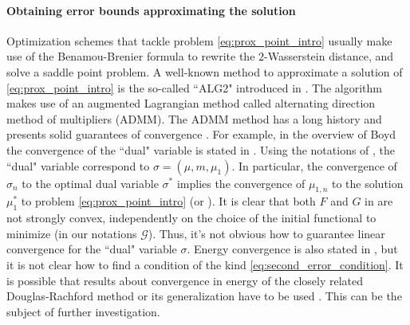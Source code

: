 \documentclass[11pt]{article}
\newcommand{\cG}{\mathcal{G}}
\numberwithin{equation}{section}
\begin{document}
\paragraph{Obtaining error bounds approximating the solution}
Optimization schemes that tackle problem \eqref{eq:prox_point_intro} usually make use of the Benamou-Brenier formula \cite{BB2000} to rewrite the $2$-Wasserstein distance, and solve a saddle point problem. A well-known method to approximate a solution of \eqref{eq:prox_point_intro} is the so-called ``ALG2" introduced in \cite{BCL16}. The algorithm makes use of an augmented Lagrangian method called alternating direction method
of multipliers (ADMM). The ADMM method has a long history and presents solid guarantees of convergence \cite{ADMM_powell69,ADMM_hestenes69,ADMM_gabay76,ADMM_gabay83,ADMM_fortin83,ADMM_glowinski87}. For example, in the overview of Boyd \cite{ADMM_boyd11} the convergence of the ``dual" variable is stated in \cite[Section 3.2.1]{ADMM_boyd11}. Using the notations of \cite{BCL16}, the ``dual" variable correspond to $\sigma = (\mu, m, \mu_1)$. In particular, the convergence of $\sigma_n$ to the optimal dual variable $\sigma^*$ implies the convergence of $\mu_{1,n}$ to the solution $\mu_1^*$ to problem \eqref{eq:prox_point_intro} (or \cite[Problem (1.4)]{BCL16}). It is clear that both $F$ and $G$ in \cite{BCL16} are not strongly convex, independently on the choice of the initial functional to minimize (in our notations $\cG$). Thus, it's not obvious how to guarantee linear convergence for the ``dual" variable $\sigma$. Energy convergence is also stated in \cite[Section 3.2.1]{ADMM_boyd11}, but it is not clear how to find a condition of the kind \eqref{eq:second_error_condition}. It is possible that results about convergence in energy of the closely related Douglas-Rachford method or its generalization have to be used \cite{EB92, BrediesDRS, Davis2016, Davis_rates, Bredies24}. This can be the subject of further investigation.

\bigskip
\end{document}
